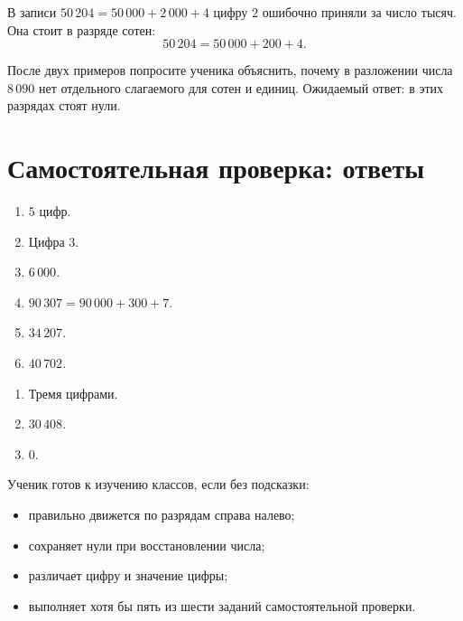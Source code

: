 \begin{warningbox}
  В записи \(50\,204=50\,000+2\,000+4\) цифру \(2\) ошибочно приняли
  за число тысяч. Она стоит в разряде сотен:
  \[
    50\,204=50\,000+200+4.
  \]
\end{warningbox}

\begin{teacherbox}
  После двух примеров попросите ученика объяснить, почему в разложении числа
  \(8\,090\) нет отдельного слагаемого для сотен и единиц. Ожидаемый ответ:
  в этих разрядах стоят нули.
\end{teacherbox}

\section{Самостоятельная проверка: ответы}

\begin{resultbox}
  \begin{enumerate}
    \item \(5\) цифр.
    \item Цифра \(3\).
    \item \(6\,000\).
    \item \(90\,307=90\,000+300+7\).
    \item \(34\,207\).
    \item \(40\,702\).
  \end{enumerate}
\end{resultbox}

\begin{checkpointbox}
  \begin{enumerate}
    \item Тремя цифрами.
    \item \(30\,408\).
    \item \(0\).
  \end{enumerate}
\end{checkpointbox}

\begin{teacherbox}
  Ученик готов к изучению классов, если без подсказки:
  \begin{itemize}
    \item правильно движется по разрядам справа налево;
    \item сохраняет нули при восстановлении числа;
    \item различает цифру и значение цифры;
    \item выполняет хотя бы пять из шести заданий самостоятельной проверки.
  \end{itemize}
\end{teacherbox}

